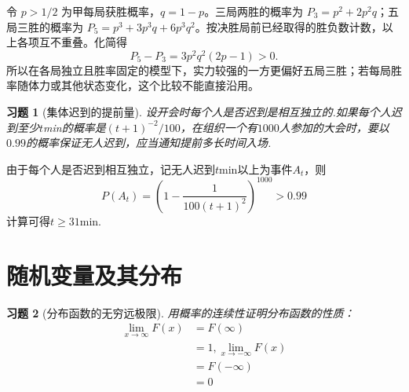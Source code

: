 \documentclass[UTF8,12pt,a4paper,fontset=fandol]{ctexart}
\newtheorem{exercise}{习题}[section]
\begin{document}
\begin{solve}\label{a:Y2.33}令 $p>1/2$ 为甲每局获胜概率，$q=1-p$。三局两胜的概率为 $P_3=p^2+2p^2q$；五局三胜的概率为 $P_5=p^3+3p^3q+6p^3q^2$。按决胜局前已经取得的胜负数计数，以上各项互不重叠。化简得\[P_5-P_3=3p^2q^2(2p-1)>0.\]所以在各局独立且胜率固定的模型下，实力较强的一方更偏好五局三胜；若每局胜率随体力或其他状态变化，这个比较不能直接沿用。\end{solve}

\begin{exercise}[集体迟到的提前量]\label{q:Y2.34}
设开会时每个人是否迟到是相互独立的.如果每个人迟到至少$t$min的概率是$(t+1)^{-2}/100$，在组织一个有$1000$人参加的大会时，要以$0.99$的概率保证无人迟到，应当通知提前多长时间入场.\par{}
\end{exercise}

\begin{solve}\label{a:Y2.34}
由于每个人是否迟到相互独立，记无人迟到$t$min以上为事件$A_t$，则
\[P({A_t}) = {(1 - \frac{1}{{100{{(t + 1)}^2}}})^{1000}} > 0.99\]
计算可得$t\geqslant 31$min.
\end{solve}

\clearpage\section{随机变量及其分布}

\begin{exercise}[分布函数的无穷远极限]\label{q:Y3.1}
用概率的连续性证明分布函数的性质：
\[\begin{aligned}\mathop {\lim }\limits_{x \to \infty } F(x) &= F(\infty ) \\&= 1,\mathop {\lim }\limits_{x \to  - \infty } F(x) \\&= F( - \infty ) \\&= 0\end{aligned}\]\par{}
\end{exercise}
\end{document}
